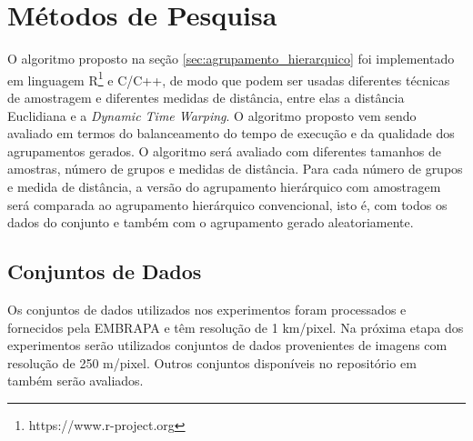 \section{Métodos de Pesquisa}
	\label{sec:metodologia}
	
O algoritmo proposto na seção \ref{sec:agrupamento_hierarquico} foi implementado em linguagem R\footnote{https://www.r-project.org} e C/C++, de modo que podem
ser usadas diferentes técnicas de amostragem e diferentes medidas de distância, entre elas a distância Euclidiana e a \textit{Dynamic Time Warping}.
O algoritmo proposto vem sendo avaliado em termos do balanceamento do tempo de execução e da qualidade dos agrupamentos 
gerados. O algoritmo será avaliado com diferentes tamanhos de amostras, número de grupos e medidas de distância. Para cada número de grupos e medida de distância, a versão do agrupamento hierárquico com amostragem será comparada ao agrupamento hierárquico convencional, isto é, com todos os dados do conjunto e também com o agrupamento gerado aleatoriamente.

\subsection{Conjuntos de Dados}

Os conjuntos de dados utilizados nos experimentos foram processados e fornecidos pela EMBRAPA \cite{embrapa2016} e têm resolução de 1 km/pixel. Na próxima etapa dos experimentos serão utilizados conjuntos de dados provenientes de imagens com resolução de 250 m/pixel. Outros conjuntos disponíveis  no repositório em \cite{global2016} também serão avaliados.


